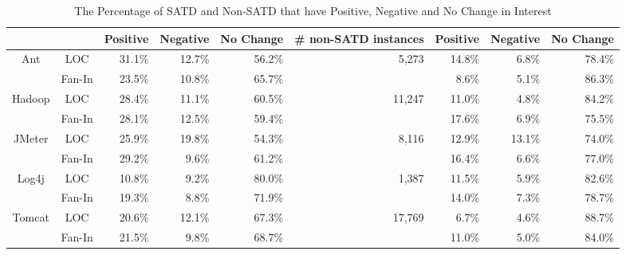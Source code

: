 \begin{table*}[tb]
  \caption{The Percentage of SATD and Non-SATD that have Positive, Negative and No Change in Interest}
  \label{tab:percentage}
  \centering

  \begin{tabular}{cc|rrr||p{0.65in}|rrr}
  \hline
        & & \textbf{Positive} & \textbf{Negative} & \textbf{No Change} & \textbf{\# non-SATD instances} & \textbf{Positive} & \textbf{Negative} & \textbf{No Change} \\
  \hline
\multirow{2}{*}{Ant} &  LOC  &  31.1\%  &  12.7\% & 56.2\% & \multicolumn{1}{r|}{\multirow{2}{*}{5,273}} &  14.8\%  &  6.8\% & 78.4\%\\
                   & Fan-In  &  23.5\%  &  10.8\% & 65.7\% &   &  8.6\%  &  5.1\% & 86.3\%\\
  \hline
\multirow{2}{*}{Hadoop} &  LOC  &  28.4\%  &  11.1\% & 60.5\% & \multicolumn{1}{r|}{\multirow{2}{*}{11,247}} &  11.0\%  &  4.8\% & 84.2\%\\
                      & Fan-In  &  28.1\%  &  12.5\% & 59.4\% &  &  17.6\%  &  6.9\% & 75.5\%\\
  \hline
\multirow{2}{*}{JMeter} &  LOC  &  25.9\%  &  19.8\% & 54.3\% & \multicolumn{1}{r|}{\multirow{2}{*}{8,116}} &  12.9\%  &  13.1\% & 74.0\%\\
                      & Fan-In  &  29.2\%  &  9.6\% & 61.2\% &  &  16.4\%  &  6.6\% & 77.0\%\\
  \hline
\multirow{2}{*}{Log4j} &  LOC  &  10.8\%  &  9.2\% & 80.0\% & \multicolumn{1}{r|}{\multirow{2}{*}{1,387}} &  11.5\%  &  5.9\% & 82.6\%\\
                     & Fan-In  &  19.3\%  &  8.8\% & 71.9\% &  &  14.0\%  &  7.3\% & 78.7\%\\
  \hline
\multirow{2}{*}{Tomcat} &  LOC &  20.6\%  &  12.1\% & 67.3\% & \multicolumn{1}{r|}{\multirow{2}{*}{17,769}} &  6.7\%  &  4.6\% & 88.7\%\\
                      & Fan-In &  21.5\%  &  9.8\% & 68.7\% &  &  11.0\%  &  5.0\% & 84.0\%\\
  \hline
  \end{tabular}
\end{table*}